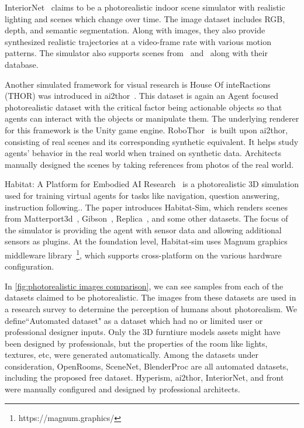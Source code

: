 InteriorNet~\cite{InteriorNet18} claims to be a photorealistic indoor scene simulator with realistic lighting and scenes which change over time.
The image dataset includes RGB, depth, and semantic segmentation.
Along with images, they also provide synthesized realistic trajectories at a video-frame rate with various motion patterns.
The simulator also supports scenes from~\cite{McCormac2017} and~\cite{Song2017SemanticSC} along with their database.

Another simulated framework for visual research is House Of inteRactions (THOR) was introduced in \gls{ai2thor}~\cite{ai2thor}.
This dataset is again an Agent focused photorealistic dataset with the critical factor being actionable objects so that agents can interact with the objects or manipulate them.
The underlying renderer for this framework is the Unity game engine.
RoboThor~\cite{robothor} is built upon \gls{ai2thor}, consisting of real scenes and its corresponding synthetic equivalent.
It helps study agents' behavior in the real world when trained on synthetic data.
Architects manually designed the scenes by taking references from photos of the real world.

Habitat: A Platform for Embodied AI Research~\cite{Savva2019} is a photorealistic 3D simulation used for training virtual agents for tasks like navigation, question answering, instruction following..
The paper introduces Habitat-Sim, which renders scenes from Matterport3d~\cite{Chang2018}, Gibson~\cite{Xia2018}, Replica~\cite{Straub2019TheRD}, and some other datasets.
The focus of the simulator is providing the agent with sensor data and allowing additional sensors as plugins.
At the foundation level, Habitat-sim uses Magnum graphics
middleware library~\footnote{https://magnum.graphics/}, which supports cross-platform on the various hardware configuration.

In \autoref{fig:photorealistic images comparison}, we can see samples from each of the datasets claimed to be photorealistic.
The images from these datasets are used in a research survey to determine the perception of humans about photorealism.
We define``Automated dataset" as a dataset which had no or limited user or professional designer inputs.
Only the 3D furntiure models assets might have been designed by professionals, but the properties of the room like lights, textures, etc, were generated automatically.
Among the datasets under consideration,
OpenRooms, SceneNet, BlenderProc are all automated datasets, including the proposed \gls{free} dataset.
Hyperism, \gls{ai2thor}, InteriorNet, and \gls{front} were manually configured and designed by professional architects.


